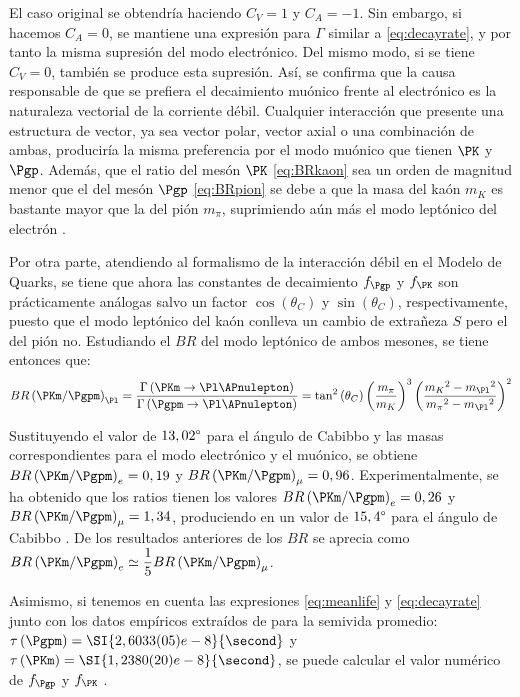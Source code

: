 El caso original se obtendría haciendo $C_{V}=1$ y $C_{A}=-1$. Sin embargo, si hacemos $C_{A}=0$, se mantiene una expresión para $\Gamma$ similar a \ref{eq:decayrate}, y por tanto la misma supresión del modo electrónico. Del mismo modo, si se tiene $C_{V}=0$, también se produce esta supresión. Así, se confirma que la causa responsable de que se prefiera el decaimiento muónico frente al electrónico es la naturaleza vectorial de la corriente débil. Cualquier interacción que presente una estructura de vector, ya sea vector polar, vector axial o una combinación de ambas, produciría la misma preferencia por el modo muónico que tienen $\PK$ y $\Pgp$. Además, que el ratio del mesón $\PK$ \ref{eq:BRkaon} sea un orden de magnitud menor que el del mesón $\Pgp$ \ref{eq:BRpion} se debe a que la masa del kaón $m_{K}$ es bastante mayor que la del pión $m_{\pi}$, suprimiendo aún más el modo leptónico del electrón \cite{Renton}.

Por otra parte, atendiendo al formalismo de la interacción débil en el Modelo de Quarks, se tiene que ahora las constantes de decaimiento $f_{\Pgp}$ y $f_{\PK}$ son prácticamente análogas salvo un factor $\cos \left( \theta _{C}\right)$ y $\sin \left( \theta _{C}\right)$, respectivamente, puesto que el modo leptónico del kaón conlleva un cambio de extrañeza $S$ pero el del pión no. Estudiando el $BR$ del modo leptónico de ambos mesones, se tiene entonces que:
\begin{equation}
BR\left(\PKm / \Pgpm\right)_{\Pl}=\dfrac{\Gamma \left( \PKm \rightarrow \Pl \APnulepton\right) }{\Gamma \left( \Pgpm \rightarrow \Pl \APnulepton\right)}=\tan ^{2}\left( \theta _{C}\right) \left( \dfrac{m_{\pi}}{m_{K}}\right) ^{3}\left( \dfrac{{m_{K}}^{2}-{m_{\Pl}}^{2}}{{m_{\pi}}^{2}-{m_{\Pl}}^{2}}\right) ^{2}
\end{equation}

Sustituyendo el valor de $13,02\degree$ para el ángulo de Cabibbo y las masas correspondientes para el modo electrónico y el muónico, se obtiene $BR\left(\PKm / \Pgpm\right)_{e}=0,19$ y $BR\left(\PKm / \Pgpm\right)_{\mu}=0,96$. Experimentalmente, se ha obtenido que los ratios tienen los valores $BR\left(\PKm / \Pgpm\right)_{e}=0,26$ y $BR\left(\PKm / \Pgpm\right)_{\mu}=1,34$, produciendo en un valor de  $15,4\degree$ para el ángulo de Cabibbo \cite{Griffiths2008}. De los resultados anteriores de los $BR$ se aprecia como $BR\left(\PKm / \Pgpm\right)_{e} \simeq \dfrac{1}{5} BR\left(\PKm / \Pgpm\right)_{\mu}$. 

Asimismo, si tenemos en cuenta las expresiones \ref{eq:meanlife} y \ref{eq:decayrate} junto con los datos empíricos extraídos de \cite{Zyla} para la semivida promedio: $\tau \left(\Pgpm\right)=\SI{2,6033(05)e-8}{\second}$ y $\tau \left(\PKm\right)=\SI{1,2380(20)e-8}{\second}$, se puede calcular el valor numérico de $f_{\Pgp}$ y $f_{\PK}$ \cite{Renton}. 

